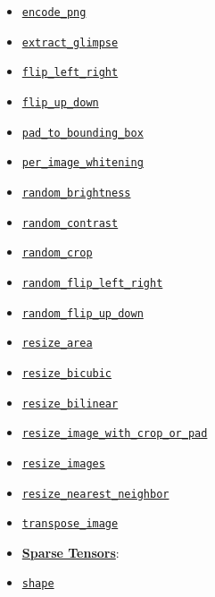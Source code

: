 \begin{itemize}
\item
  \href{../../api_docs/python/image.md\#encode_png}{\texttt{encode\_png}}
\item
  \href{../../api_docs/python/image.md\#extract_glimpse}{\texttt{extract\_glimpse}}
\item
  \href{../../api_docs/python/image.md\#flip_left_right}{\texttt{flip\_left\_right}}
\item
  \href{../../api_docs/python/image.md\#flip_up_down}{\texttt{flip\_up\_down}}
\item
  \href{../../api_docs/python/image.md\#pad_to_bounding_box}{\texttt{pad\_to\_bounding\_box}}
\item
  \href{../../api_docs/python/image.md\#per_image_whitening}{\texttt{per\_image\_whitening}}
\item
  \href{../../api_docs/python/image.md\#random_brightness}{\texttt{random\_brightness}}
\item
  \href{../../api_docs/python/image.md\#random_contrast}{\texttt{random\_contrast}}
\item
  \href{../../api_docs/python/image.md\#random_crop}{\texttt{random\_crop}}
\item
  \href{../../api_docs/python/image.md\#random_flip_left_right}{\texttt{random\_flip\_left\_right}}
\item
  \href{../../api_docs/python/image.md\#random_flip_up_down}{\texttt{random\_flip\_up\_down}}
\item
  \href{../../api_docs/python/image.md\#resize_area}{\texttt{resize\_area}}
\item
  \href{../../api_docs/python/image.md\#resize_bicubic}{\texttt{resize\_bicubic}}
\item
  \href{../../api_docs/python/image.md\#resize_bilinear}{\texttt{resize\_bilinear}}
\item
  \href{../../api_docs/python/image.md\#resize_image_with_crop_or_pad}{\texttt{resize\_image\_with\_crop\_or\_pad}}
\item
  \href{../../api_docs/python/image.md\#resize_images}{\texttt{resize\_images}}
\item
  \href{../../api_docs/python/image.md\#resize_nearest_neighbor}{\texttt{resize\_nearest\_neighbor}}
\item
  \href{../../api_docs/python/image.md\#transpose_image}{\texttt{transpose\_image}}
\item
  \textbf{\href{../../api_docs/python/sparse_ops.md}{Sparse Tensors}}:
\item
  \href{../../api_docs/python/sparse_ops.md\#shape}{\texttt{shape}}

\end{itemize}
